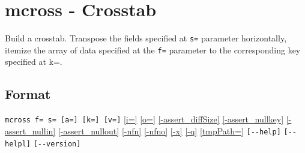 
%

\section{mcross - Crosstab\label{sect:mcross}}
Build a crosstab. Transpose the fields specified at \verb|s=| parameter horizontally, itemize the array of data specified at the \verb|f=| parameter to the corresponding key specified at k=. 

\subsection*{Format}
\verb|mcross f= s= [a=] [k=] [v=]|   
\hyperref[sect:option_i]{[i=]}
\hyperref[sect:option_o]{[o=]}
\hyperref[sect:option_assert_diffSize]{[-assert\_diffSize]}
\hyperref[sect:option_assert_nullkey]{[-assert\_nullkey]}
\hyperref[sect:option_assert_nullin]{[-assert\_nullin]}
\hyperref[sect:option_assert_nullout]{[-assert\_nullout]}
\hyperref[sect:option_nfn]{[-nfn]} 
\hyperref[sect:option_nfno]{[-nfno]}  
\hyperref[sect:option_x]{[-x]}
\hyperref[sect:option_q]{[-q]}
\hyperref[sect:option_option_tmppath]{[tmpPath=]}
\verb|[--help]|
\verb|[--helpl]|
\verb|[--version]|\\

